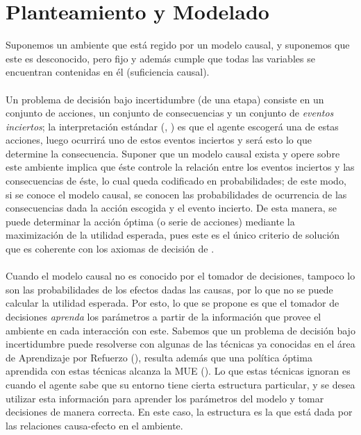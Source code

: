 \documentclass[11pt]{article}
\theoremstyle{plain}
\begin{document}
\section{Planteamiento y Modelado}
Suponemos un ambiente que está regido por un modelo causal, y suponemos que este es desconocido, pero fijo y además cumple que todas las variables se encuentran contenidas en él (suficiencia causal).\\
\\
\indent Un problema de decisión bajo incertidumbre (de una etapa) consiste en un conjunto de acciones, un conjunto de consecuencias y un conjunto de \textit{eventos inciertos}; la interpretación estándar (\cite{bernardo2000bayesian}, \cite{gilboa2009decision}) es que el agente escogerá una de estas acciones, luego ocurrirá uno de estos eventos inciertos y será esto lo que determine la consecuencia. Suponer que un modelo causal exista y opere sobre este ambiente implica que éste controle la relación entre los eventos inciertos y las consecuencias de éste, lo cual queda codificado en probabilidades; de este modo, si se conoce el modelo causal, se conocen las probabilidades de ocurrencia de las consecuencias dada la acción escogida y el evento incierto. De esta manera, se puede determinar la acción óptima (o serie de acciones) mediante la maximización de la utilidad esperada, pues este es el único criterio de solución que es coherente con los axiomas de decisión de \cite{savage1954the}.\\
\\
\indent Cuando el modelo causal no es conocido por el tomador de decisiones, tampoco lo son las probabilidades de los efectos dadas las causas, por lo que no se puede calcular la utilidad esperada. Por esto, lo que se propone es que el tomador de decisiones \textit{aprenda} los parámetros a partir de la información que provee el ambiente en cada interacción con este. Sabemos que un problema de decisión bajo incertidumbre puede resolverse con algunas de las técnicas ya conocidas en el área de Aprendizaje por Refuerzo (\cite{sutton1998reinforcement}), resulta además que una política óptima aprendida con estas técnicas alcanza la MUE (\cite{webb2007game}). Lo que estas técnicas ignoran es cuando el agente sabe que su entorno tiene cierta estructura particular, y se desea utilizar esta información para aprender los parámetros del modelo y tomar decisiones de manera correcta. En este caso, la estructura es la que está dada por las relaciones causa-efecto en el ambiente.\\
\\
\end{document}
